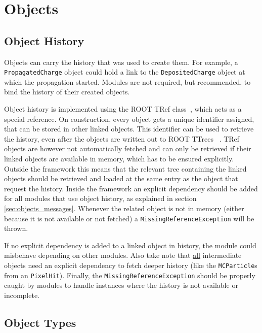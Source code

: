 \section{Objects}
\label{sec:objects}

\subsection{Object History}
\label{sec:objhistory}

Objects can carry the history that was used to create them. 
For example, a \texttt{PropagatedCharge} object could hold a link to the \texttt{DepositedCharge} object at which the propagation started.
Modules are not required, but recommended, to bind the history of their created objects.

Object history is implemented using the ROOT TRef class~\cite{roottref}, which acts as a special reference. 
On construction, every object gets a unique identifier assigned, that can be stored in other linked objects.
This identifier can be used to retrieve the history, even after the objects are written out to ROOT TTrees ~\cite{roottree}.
TRef objects are however not automatically fetched and can only be retrieved if their linked objects are available in memory, which has to be ensured explicitly.
Outside the framework this means that the relevant tree containing the linked objects should be retrieved and loaded at the same entry as the object that request the history.
Inside the framework an explicit dependency should be added for all modules that use object history, as explained in section \ref{sec:objects_messages}.
Whenever the related object is not in memory (either because it is not available or not fetched) a \texttt{MissingReferenceException} will be thrown. 

\begin{warning}
    If no explicit dependency is added to a linked object in history, the module could misbehave depending on other modules. 
    Also take note that \underline{all} intermediate objects need an explicit dependency to fetch deeper history (like the \texttt{MCParticle}s from an \texttt{PixelHit}). 
    Finally, the \texttt{MissingReferenceException} should be properly caught by modules to handle instances where the history is not available or incomplete.
\end{warning}

\subsection{Object Types}
\label{sec:objtypes}

